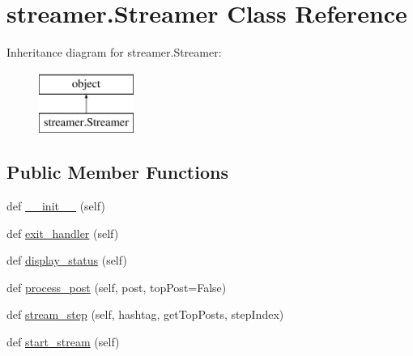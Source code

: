 \hypertarget{classstreamer_1_1_streamer}{}\section{streamer.\+Streamer Class Reference}
\label{classstreamer_1_1_streamer}
Inheritance diagram for streamer.\+Streamer\+:\begin{figure}[H]
\begin{center}
\leavevmode
\includegraphics[height=2.000000cm]{classstreamer_1_1_streamer}
\end{center}
\end{figure}
\subsection*{Public Member Functions}
\begin{DoxyCompactItemize}
\item 
def \mbox{\hyperlink{classstreamer_1_1_streamer_aae063a4ecba841acd0f6994af01d59c2}{\+\_\+\+\_\+init\+\_\+\+\_\+}} (self)
\item 
def \mbox{\hyperlink{classstreamer_1_1_streamer_a23ddd6eaeab682bd4267c13b0d6ff45a}{exit\+\_\+handler}} (self)
\item 
def \mbox{\hyperlink{classstreamer_1_1_streamer_a2b946c06d88923c6e742c7cfeb50331b}{display\+\_\+status}} (self)
\item 
def \mbox{\hyperlink{classstreamer_1_1_streamer_adf219de2f5539f544a36ce625d3c265f}{process\+\_\+post}} (self, post, top\+Post=False)
\item 
def \mbox{\hyperlink{classstreamer_1_1_streamer_a17ac10d55adba12d6f2ba2bc842d0176}{stream\+\_\+step}} (self, hashtag, get\+Top\+Posts, step\+Index)
\item 
def \mbox{\hyperlink{classstreamer_1_1_streamer_a4fa871cd42320cd2df771d9844d1a67c}{start\+\_\+stream}} (self)
\end{DoxyCompactItemize}
